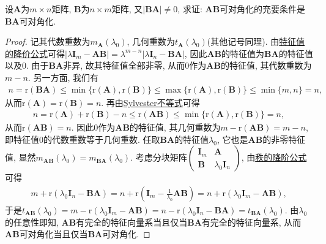 \documentclass[../../main.tex]{subfiles}
\begin{document}
\begin{proposition}\label{proposition:矩阵乘积可对角化且可逆则交换后也可对角化}
设\(\boldsymbol{A}\)为\(m\times n\)矩阵, \(\boldsymbol{B}\)为\(n\times m\)矩阵, 又\(|\boldsymbol{B}\boldsymbol{A}|\neq 0\), 求证: \(\boldsymbol{A}\boldsymbol{B}\)可对角化的充要条件是\(\boldsymbol{B}\boldsymbol{A}\)可对角化.
\end{proposition}
\begin{proof}
记其代数重数为\(m_{\boldsymbol{A}}(\lambda_0)\), 几何重数为\(t_{\boldsymbol{A}}(\lambda_0)\)(其他记号同理). 
由\hyperref[theorem:特征值的降价公式]{特征值的降价公式}可得\(|\lambda\boldsymbol{I}_m - \boldsymbol{A}\boldsymbol{B}| = \lambda^{m - n}|\lambda\boldsymbol{I}_n - \boldsymbol{B}\boldsymbol{A}|\), 因此\(\boldsymbol{A}\boldsymbol{B}\)的特征值为\(\boldsymbol{B}\boldsymbol{A}\)的特征值以及\(0\). 由于\(\boldsymbol{B}\boldsymbol{A}\)非异, 故其特征值全部非零, 从而\(0\)作为\(\boldsymbol{A}\boldsymbol{B}\)的特征值, 其代数重数为\(m - n\). 另一方面, 我们有
\begin{align*}
n = \mathrm{r}(\boldsymbol{B}\boldsymbol{A})\leq \min\{\mathrm{r}(\boldsymbol{A}),\mathrm{r}(\boldsymbol{B})\}\leq \max\{\mathrm{r}(\boldsymbol{A}),\mathrm{r}(\boldsymbol{B})\}\leq \min\{m,n\} = n,
\end{align*}
从而\(\mathrm{r}(\boldsymbol{A}) = \mathrm{r}(\boldsymbol{B}) = n\). 再由\hyperref[proposition:Sylvester不等式]{Sylvester不等式}可得
\begin{align*}
n = \mathrm{r}(\boldsymbol{A})+\mathrm{r}(\boldsymbol{B}) - n\leq \mathrm{r}(\boldsymbol{A}\boldsymbol{B})\leq \min\{\mathrm{r}(\boldsymbol{A}),\mathrm{r}(\boldsymbol{B})\} = n,
\end{align*}
从而\(\mathrm{r}(\boldsymbol{A}\boldsymbol{B}) = n\). 因此\(0\)作为\(\boldsymbol{A}\boldsymbol{B}\)的特征值, 其几何重数为\(m - \mathrm{r}(\boldsymbol{A}\boldsymbol{B}) = m - n\), 即特征值\(0\)的代数重数等于几何重数. 任取\(\boldsymbol{B}\boldsymbol{A}\)的特征值\(\lambda_0\), 它也是\(\boldsymbol{A}\boldsymbol{B}\)的非零特征值, 显然\(m_{\boldsymbol{A}\boldsymbol{B}}(\lambda_0) = m_{\boldsymbol{B}\boldsymbol{A}}(\lambda_0)\). 考虑分块矩阵\(\begin{pmatrix}
\boldsymbol{I}_m&\boldsymbol{A}\\
\boldsymbol{B}&\lambda_0\boldsymbol{I}_n
\end{pmatrix}\), 由\hyperref[proposition:秩的降阶公式]{秩的降阶公式}可得
\begin{align*}
m + \mathrm{r}(\lambda_0\boldsymbol{I}_n - \boldsymbol{B}\boldsymbol{A}) = n + \mathrm{r}(\boldsymbol{I}_m - \frac{1}{\lambda_0}\boldsymbol{A}\boldsymbol{B}) = n + \mathrm{r}(\lambda_0\boldsymbol{I}_m - \boldsymbol{A}\boldsymbol{B}),
\end{align*}
于是\(t_{\boldsymbol{A}\boldsymbol{B}}(\lambda_0) = m - \mathrm{r}(\lambda_0\boldsymbol{I}_m - \boldsymbol{A}\boldsymbol{B}) = n - \mathrm{r}(\lambda_0\boldsymbol{I}_n - \boldsymbol{B}\boldsymbol{A}) = t_{\boldsymbol{B}\boldsymbol{A}}(\lambda_0)\). 由\(\lambda_0\)的任意性即知, \(\boldsymbol{A}\boldsymbol{B}\)有完全的特征向量系当且仅当\(\boldsymbol{B}\boldsymbol{A}\)有完全的特征向量系, 从而\(\boldsymbol{A}\boldsymbol{B}\)可对角化当且仅当\(\boldsymbol{B}\boldsymbol{A}\)可对角化.
\end{proof}
\end{document}
